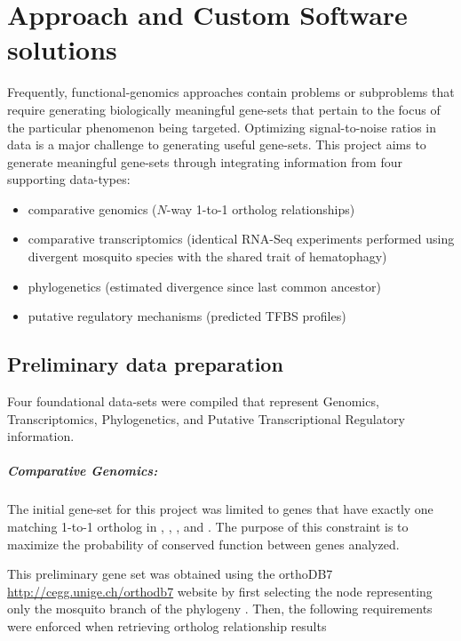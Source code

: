 
\chapter{Approach and Custom Software solutions} \label{chap:3}


Frequently, \gls{functional-genomics} approaches contain problems or subproblems that require generating biologically meaningful gene-sets that pertain to the focus of the particular phenomenon being targeted.
Optimizing signal-to-noise ratios in data is a major challenge to generating useful gene-sets.
This project aims to generate meaningful gene-sets through integrating information from four supporting data-types:

\begin{itemize}
    \item comparative genomics ($N$-way 1-to-1 ortholog relationships)
    \item comparative transcriptomics (identical \gls{RNA-Seq} experiments performed using divergent mosquito species with the shared trait of \gls{hematophagy})
    \item phylogenetics (estimated divergence since last common ancestor)
    \item putative regulatory mechanisms (predicted \gls{TFBS} profiles)
\end{itemize}



\section{Preliminary data preparation} \label{sec:prelim-data}

Four foundational data-sets were compiled that represent Genomics, Transcriptomics, Phylogenetics, and Putative Transcriptional Regulatory information.

\paragraph*{Comparative Genomics:}

The initial gene-set for this project was limited to genes that have exactly one matching 1-to-1 ortholog in \Aa, \Ag, \As, and \Cq.
The purpose of this constraint is to maximize the probability of conserved function between genes analyzed. 

This preliminary gene set was obtained using the orthoDB7 \url{http://cegg.unige.ch/orthodb7} website by first selecting the node representing only the mosquito branch of the phylogeny \cite{Waterhouse2013}.
Then, the following requirements were enforced when retrieving ortholog relationship results 


